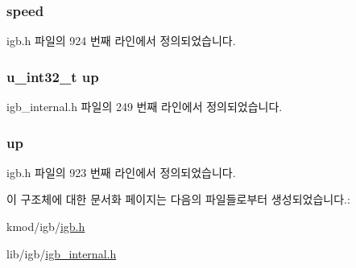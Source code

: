\subsubsection[{\texorpdfstring{speed}{speed}}]{ speed}\hypertarget{structigb__link__cmd_a0d3e0f150bbdbd462d4a6dd4c20f5def}{}\label{structigb__link__cmd_a0d3e0f150bbdbd462d4a6dd4c20f5def}


igb.\+h 파일의 924 번째 라인에서 정의되었습니다.

\subsubsection[{\texorpdfstring{up}{up}}]{\setlength{\rightskip}{0pt plus 5cm}u\+\_\+int32\+\_\+t up}\hypertarget{structigb__link__cmd_a2f6e3c95f8f483142f9541c5f8c8b56a}{}\label{structigb__link__cmd_a2f6e3c95f8f483142f9541c5f8c8b56a}


igb\+\_\+internal.\+h 파일의 249 번째 라인에서 정의되었습니다.

\subsubsection[{\texorpdfstring{up}{up}}]{ up}\hypertarget{structigb__link__cmd_ac27e774ae49a8be876d42d59686aec61}{}\label{structigb__link__cmd_ac27e774ae49a8be876d42d59686aec61}


igb.\+h 파일의 923 번째 라인에서 정의되었습니다.



이 구조체에 대한 문서화 페이지는 다음의 파일들로부터 생성되었습니다.\+:\begin{DoxyCompactItemize}
\item 
kmod/igb/\hyperlink{kmod_2igb_2igb_8h}{igb.\+h}\item 
lib/igb/\hyperlink{igb__internal_8h}{igb\+\_\+internal.\+h}\end{DoxyCompactItemize}
